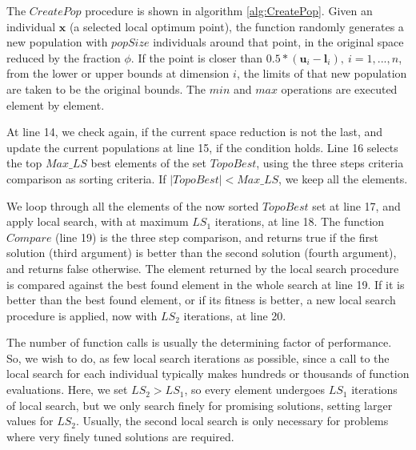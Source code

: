 


The $CreatePop$ procedure is shown in algorithm \ref{alg:CreatePop}. Given an individual $\bm{x}$ (a selected local optimum point), the function randomly generates a new population with $popSize$ individuals around that point, in the original space reduced by the fraction $\phi$. If the point is closer than $0.5 * (\bm{u}_i - \bm{l}_i), \ i = 1, ..., n$, from the lower or upper bounds at dimension $i$, the limits of that new population are taken to be the original bounds. The $min$ and $max$ operations are executed element by element.


At line 14, we check again, if the current space reduction is not the last, and update the current populations at line 15, if the condition holds. Line 16 selects the top $Max\_LS$ best elements of the set $TopoBest$, using the three steps criteria comparison as sorting criteria. If $|TopoBest| < Max\_LS$, we keep all the elements.

We loop through all the elements of the now sorted $TopoBest$ set at line 17, and apply local search, with at maximum $LS_1$ iterations, at line 18. The function $Compare$ (line 19) is the three step comparison, and returns true if the first solution (third argument) is better than the second solution (fourth argument), and returns false otherwise. The element returned by the local search procedure is compared against the best found element in the whole search at line 19. If it is better than the best found element, or if its fitness is better, a new local search procedure is applied, now with $LS_2$ iterations, at line 20.


The number of function calls is usually the determining factor of performance. So, we wish to do, as few local search iterations as possible, since a call to the local search for each individual typically makes hundreds or thousands of function evaluations. Here, we set $LS_2 > LS_1$, so every element undergoes $LS_1$ iterations of local search, but we only search finely for promising solutions, setting larger values for $LS_2$. Usually, the second local search is only necessary for problems where very finely tuned solutions are required.

